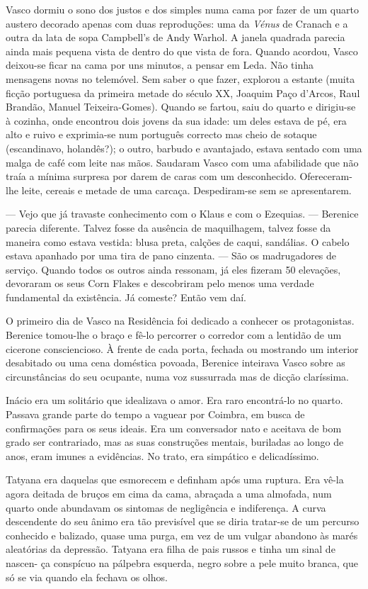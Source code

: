 Vasco dormiu o sono dos justos e dos simples numa cama por fazer de um
quarto austero decorado apenas com duas reproduções: uma da
\emph{Vénus }de Cranach e a outra da lata de sopa Campbell's de Andy
Warhol. A janela quadrada parecia ainda mais pequena vista de dentro do
que vista de fora. Quando acordou, Vasco deixou-se ficar na cama por uns
minutos, a pensar em Leda. Não tinha mensagens novas no telemóvel.
Sem saber o que fazer, explorou a estante (muita ficção portuguesa da
primeira metade do século XX, Joaquim Paço d'Arcos, Raul Brandão, Manuel
Teixeira-Gomes). Quando se fartou, saiu do quarto e dirigiu-se à
cozinha, onde encontrou dois jovens da sua idade: um deles estava de pé,
era alto e ruivo e exprimia-se num português correcto mas cheio de
sotaque (escandinavo, holandês?); o outro, barbudo e avantajado, estava
sentado com uma malga de café com leite nas mãos. Saudaram Vasco com uma
afabilidade que não traía a mínima surpresa por darem de caras com um
desconhecido. Ofereceram-lhe leite, cereais e metade de uma carcaça.
Despediram-se sem se apresentarem.

--- Vejo que já travaste conhecimento com o Klaus e com o Ezequias. ---
  Berenice parecia diferente. Talvez fosse da ausência de maquilhagem,
  talvez fosse da maneira como estava vestida: blusa preta, calções de
  caqui, sandálias. O cabelo estava apanhado por uma tira de pano
  cinzenta. --- São os madrugadores de serviço. Quando todos os outros
  ainda ressonam, já eles fizeram 50 elevações, devoraram os seus Corn
  Flakes e descobriram pelo menos uma verdade fundamental da existência.
  Já comeste? Então vem daí.

O primeiro dia de Vasco na Residência foi dedicado a conhecer os
protagonistas. Berenice tomou-lhe o braço e fê-lo percorrer o corredor com a lentidão de um cicerone consciencioso.
À frente de cada porta, fechada ou mostrando um interior desabitado ou
uma cena doméstica povoada, Berenice inteirava Vasco sobre as
circunstâncias do seu ocupante, numa voz sussurrada mas de dicção
claríssima.

Inácio era um solitário que idealizava o amor. Era raro encontrá-lo no
quarto. Passava grande parte do tempo a vaguear por Coimbra, em busca de
confirmações para os seus ideais.
Era um conversador nato e aceitava de bom grado ser contrariado, mas
as suas construções mentais, buriladas ao longo de anos, eram imunes a
evidências. No trato, era simpático e delicadíssimo.

Tatyana era daquelas que esmorecem e definham após uma ruptura. Era
vê-la agora deitada de bruços em cima da cama, abraçada a uma almofada,
num quarto onde abundavam os sintomas de negligência e indiferença. A
curva descendente do seu ânimo era tão previsível que se diria
tratar-se de um percurso conhecido e balizado, quase uma purga, em vez
de um vulgar abandono às marés aleatórias da depressão. Tatyana era
filha de pais russos e tinha um sinal de nascen- ça conspícuo na
pálpebra esquerda, negro sobre a pele muito branca, que só se via quando
ela fechava os olhos.

